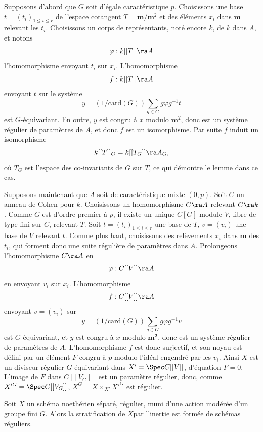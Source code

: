 \documentclass[10pt]{../fichiers-configuration-latex/smfart}
\begin{document}
Supposons d'abord que $G$ soit d'égale caractéristique $p$. Choisissons une base $t = (t_i)_{1 \le i
\le r}$ de l'espace cotangent $T = \mathbf{m}/\mathbf{m}^2$ et des éléments $x_i$ dans $\mathbf{m}$
relevant les $t_i$. Choisissons un corps de représentants, noté encore $k$, de $k$ dans $A$, et
notons $$ \varphi : k[[T]] \ra A $$ l'homomorphisme envoyant $t_i$ sur $x_i$. L'homomorphisme $$ f :
k[[T]] \ra A $$ envoyant $t$ sur le système $$ y = (1/\mathrm{card}(G))\sum_{g \in G} g\varphi
g^{-1}t $$ est $G$-équivariant. En outre, $y$ est congru à $x$ modulo $\mathbf{m}^2$, donc est un
système régulier de paramètres de $A$, et donc $f$ est un isomorphisme. Par suite $f$ induit un
isomorphisme $$ k[[T]]_G = k[[T_G]] \ra A_G, $$ où $T_G$ est l'espace des co-invariants de $G$ sur
$T$, ce qui démontre le lemme dans ce cas.

Supposons maintenant que $A$ soit de caractéristique mixte $(0,p)$. Soit $C$ un anneau de Cohen pour
$k$. Choisissons un homomorphisme $C \ra A$ relevant $C \ra k$. Comme $G$ est d'ordre premier à $p$,
il existe un unique $C[G]$-module $V$, libre de type fini sur $C$, relevant $T$. Soit $t = (t_i)_{1
\le i \le r}$ une base de $T$, $v = (v_i)$ une base de $V$ relevant $t$. Comme plus haut,
choisissons des relèvements $x_i$ dans $\mathbf{m}$ des $t_i$, qui forment donc une suite régulière
de paramètres dans $A$. Prolongeons l'homomorphisme $C \ra A$ en $$ \varphi : C[[V]] \ra A $$ en
envoyant $v_i$ sur $x_i$. L'homomorphisme $$ f : C[[V]] \ra A $$ envoyant $v = (v_i)$ sur $$ y =
(1/\mathrm{card}(G))\sum_{g \in G} g\varphi g^{-1}v $$ est $G$-équivariant, et $y$ est congru à $x$
modulo $\mathbf{m^2}$, donc est un système régulier de paramètres de $A$. L'homomorphisme $f$ est
donc surjectif, et son noyau est défini par un élément $F$ congru à $p$ modulo l'idéal engendré par
les $v_i$. Ainsi $X$ est un diviseur régulier $G$-équivariant dans $X' = \Spec C[[V]]$, d'équation
$F=0$. L'image de $F$ dans $C[[V_G]]$ est un paramètre régulier, donc, comme $X'^G = \Spec C[[V_G]]$,
$X^G = X \times_{X'} X'^G$ est régulier.  \begin{corollaire}\label{6-stratification régulière} Soit
$X$ un schéma noethérien séparé, régulier, muni d'une action modérée d'un groupe fini $G$. Alors la
stratification de $X $par l'inertie est formée de schémas réguliers.  \end{corollaire}
\end{document}
